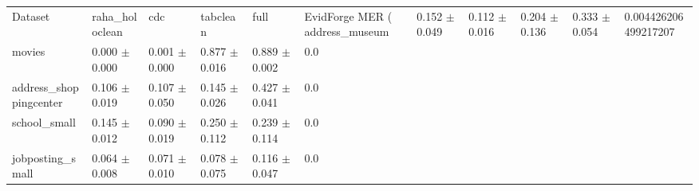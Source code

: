 \begin{tabular}{llllll}
\hline
Dataset & raha_holoclean & cdc & tabclean & full & EvidForge MER (%
\hline
address\_museum & 0.152 $\pm$ 0.049 & 0.112 $\pm$ 0.016 & 0.204 $\pm$ 0.136 & 0.333 $\pm$ 0.054 & 0.004426206499217207 \\
movies & 0.000 $\pm$ 0.000 & 0.001 $\pm$ 0.000 & 0.877 $\pm$ 0.016 & 0.889 $\pm$ 0.002 & 0.0 \\
address\_shoppingcenter & 0.106 $\pm$ 0.019 & 0.107 $\pm$ 0.050 & 0.145 $\pm$ 0.026 & 0.427 $\pm$ 0.041 & 0.0 \\
school\_small & 0.145 $\pm$ 0.012 & 0.090 $\pm$ 0.019 & 0.250 $\pm$ 0.112 & 0.239 $\pm$ 0.114 & 0.0 \\
jobposting\_small & 0.064 $\pm$ 0.008 & 0.071 $\pm$ 0.010 & 0.078 $\pm$ 0.075 & 0.116 $\pm$ 0.047 & 0.0 \\
\hline
\end{tabular}

